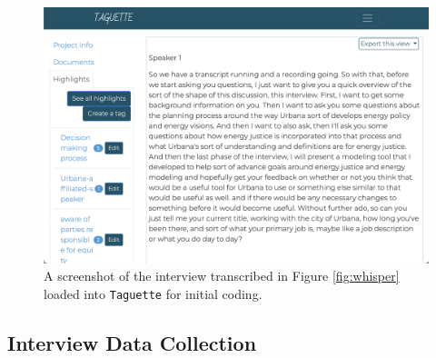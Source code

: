 \begin{figure}[htbp!]
    \centering
    \includegraphics[width=0.8\columnwidth]{figures/07_interview_chapter/taguette-screenshot}
    \caption{A screenshot of the interview transcribed in Figure \ref{fig:whisper}
    loaded into \texttt{Taguette} for initial coding.}
    \label{fig:taguette}
\end{figure}

\subsection{Interview Data Collection}

